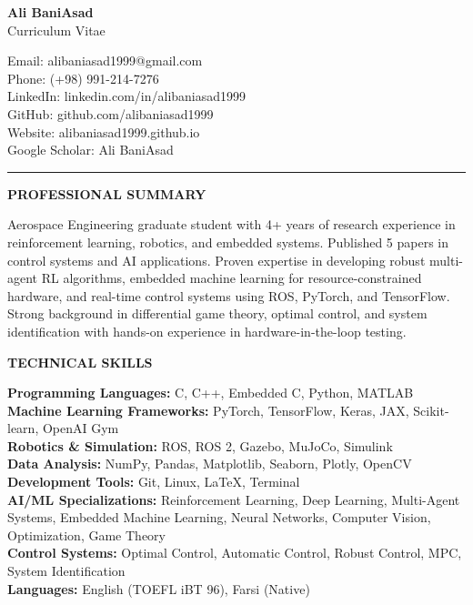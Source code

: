 \documentclass[12pt]{article}
\begin{document}

\begin{center}
	{\Large \bfseries Ali BaniAsad} \\
	\vspace{4pt}
	{\large Curriculum Vitae}
\end{center}

\noindent
Email: alibaniasad1999@gmail.com \\
Phone: (+98) 991-214-7276 \\
LinkedIn: linkedin.com/in/alibaniasad1999 \\
GitHub: github.com/alibaniasad1999 \\
Website: alibaniasad1999.github.io \\
Google Scholar: Ali BaniAsad

\noindent\rule[0.5ex]{\linewidth}{.5pt}

\begin{center}
	{\noindent \bfseries PROFESSIONAL SUMMARY}
\end{center}

\vspace{-4pt}
\noindent
Aerospace Engineering graduate student with 4+ years of research experience in reinforcement learning, robotics, and embedded systems. Published 5 papers in control systems and AI applications. Proven expertise in developing robust multi-agent RL algorithms, embedded machine learning for resource-constrained hardware, and real-time control systems using ROS, PyTorch, and TensorFlow. Strong background in differential game theory, optimal control, and system identification with hands-on experience in hardware-in-the-loop testing.

\vspace{8pt}

\begin{center}
	{\noindent \bfseries TECHNICAL SKILLS}
\end{center}

\vspace{-4pt}
\noindent
\textbf{Programming Languages:} C, C++, Embedded C, Python, MATLAB \\
\textbf{Machine Learning Frameworks:} PyTorch, TensorFlow, Keras, JAX, Scikit-learn, OpenAI Gym \\
\textbf{Robotics \& Simulation:} ROS, ROS 2, Gazebo, MuJoCo, Simulink \\
\textbf{Data Analysis:} NumPy, Pandas, Matplotlib, Seaborn, Plotly, OpenCV \\
\textbf{Development Tools:} Git, Linux, LaTeX, Terminal \\
\textbf{AI/ML Specializations:} Reinforcement Learning, Deep Learning, Multi-Agent Systems, Embedded Machine Learning, Neural Networks, Computer Vision, Optimization, Game Theory \\
\textbf{Control Systems:} Optimal Control, Automatic Control, Robust Control, MPC, System Identification \\
\textbf{Languages:} English (TOEFL iBT 96), Farsi (Native)
\end{document}
